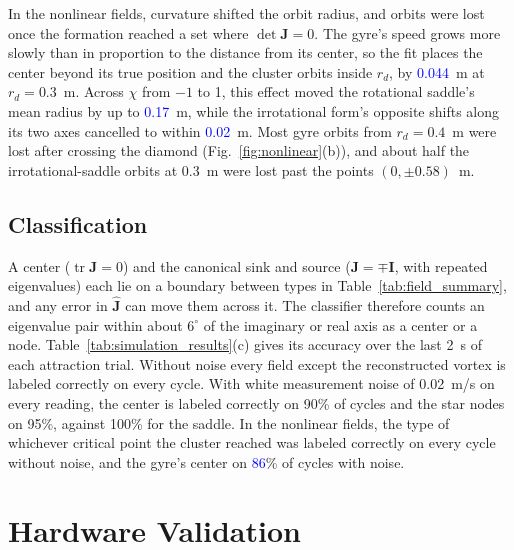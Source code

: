 \documentclass[lettersize,journal]{IEEEtran}
\newcommand{\rev}[1]{#1}                             %
\newcommand{\newnum}[1]{\textcolor{blue}{#1}}        %
\begin{document}
In the nonlinear fields, curvature shifted the orbit radius, and orbits were lost once the formation reached a set where $\det\mathbf{J} = 0$. The gyre's speed grows more slowly than in proportion to the distance from its center, so the fit places the center beyond its true position and the cluster orbits inside $r_d$, by \newnum{0.044}~m at $r_d = 0.3$~m. Across $\chi$ from $-1$ to 1, this effect moved the rotational saddle's mean radius by up to \newnum{0.17}~m, while the irrotational form's opposite shifts along its two axes cancelled to within \newnum{0.02}~m. Most gyre orbits from $r_d = 0.4$~m were lost after crossing the diamond (Fig.~\ref{fig:nonlinear}(b)), and about half the irrotational-saddle orbits at 0.3~m were lost past the points $(0, \pm 0.58)$~m. %

\subsection{Classification}

A center ($\operatorname{tr}\mathbf{J} = 0$) and the canonical sink and source ($\mathbf{J} = \mp\mathbf{I}$, with repeated eigenvalues) each lie on a boundary between types in Table~\ref{tab:field_summary}, and any error in $\hat{\mathbf{J}}$ can move them across it. The classifier therefore counts an eigenvalue pair within about $6^\circ$ of the imaginary or real axis as a center or a node. Table~\ref{tab:simulation_results}(c) gives its accuracy over the last 2~s of each attraction trial. Without noise every field except the reconstructed vortex is labeled correctly on every cycle. With white measurement noise of 0.02~m/s on every reading, the center is labeled correctly on \rev{90}\% of cycles and the star nodes on \rev{95}\%, against \rev{100}\% for the saddle. In the nonlinear fields, the type of whichever critical point the cluster reached was labeled correctly on every cycle without noise, and the gyre's center on \newnum{86}\% of cycles with noise. %

\section{Hardware Validation}
\end{document}
